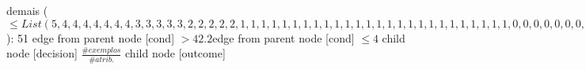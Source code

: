 {{{{%
demais ($\leq List(5, 4, 4, 4, 4, 4, 4, 4, 3, 3, 3, 3, 3, 2, 2, 2, 2, 2, 1, 1, 1, 1, 1, 1, 1, 1, 1, 1, 1, 1, 1, 1, 1, 1, 1, 1, 1, 1, 1, 1, 1, 1, 1, 1, 0, 0, 0, 0, 0, 0, 0, 0, 0, 0, 0, 0, 0, 0, 0, 0, 0, 0, 0, 0, 0, 0, 0, 0, 0, 0, 0, 0, 0, 0, 0)$): 51} edge from parent node [cond] {$>42.2$}}edge from parent node [cond] {$\leq4$}}
child {node [decision] {$\frac{\#exemplos}{\#atrib.}$}
child {node [outcome] {
}}}}
